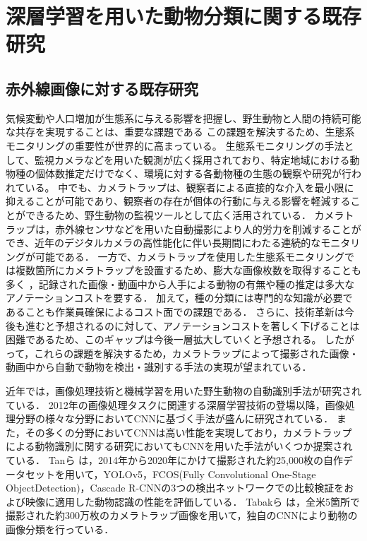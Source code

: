 \documentclass[a4paper,11pt,nomag]{jsreport}
\begin{document}
\setcounter{chapter}{2}

\chapter*{深層学習を用いた動物分類に関する既存研究}

\section{赤外線画像に対する既存研究}

気候変動や人口増加が生態系に与える影響を把握し、野生動物と人間の持続可能な共存を実現することは、重要な課題である
この課題を解決するため、生態系モニタリングの重要性が世界的に高まっている\cite{zwerts2021, bandaru2024}。
生態系モニタリングの手法として、監視カメラなどを用いた観測が広く採用されており、特定地域における動物種の個体数推定だけでなく、環境に対する各動物種の生態の観察や研究が行われている\cite{trolliet2014}。
中でも、カメラトラップは、観察者による直接的な介入を最小限に抑えることが可能であり、観察者の存在が個体の行動に与える影響を軽減することができるため、野生動物の監視ツールとして広く活用されている\cite{本郷2018, abood2023}．
カメラトラップは，赤外線センサなどを用いた自動撮影により人的労力を削減することができ、近年のデジタルカメラの高性能化に伴い長期間にわたる連続的なモニタリングが可能である．
一方で、カメラトラップを使用した生態系モニタリングでは複数箇所にカメラトラップを設置するため、膨大な画像枚数を取得することも多く \cite{kays2020, si2014}，記録された画像・動画中から人手による動物の有無や種の推定は多大なアノテーションコストを要する\cite{thangaraj2023}．
加えて，種の分類には専門的な知識が必要であることも作業員確保によるコスト面での課題である．
さらに、技術革新は今後も進むと予想されるのに対して、アノテーションコストを著しく下げることは困難であるため、このギャップは今後一層拡大していくと予想される\cite{安藤2019}。
したがって，これらの課題を解決するため，カメラトラップによって撮影された画像・動画中から自動で動物を検出・識別する手法の実現が望まれている．

近年では，画像処理技術と機械学習を用いた野生動物の自動識別手法が研究されている．
2012年の画像処理タスクに関連する深層学習技術の登場以降，画像処理分野の様々な分野においてCNNに基づく手法が盛んに研究されている．
また，その多くの分野においてCNNは高い性能を実現しており，カメラトラップによる動物識別に関する研究においてもCNNを用いた手法がいくつか提案されている．
Tanら \cite{tan2022}は，2014年から2020年にかけて撮影された約25,000枚の自作データセットを用いて，YOLOv5，FCOS(Fully Convolutional One-Stage ObjectDetection)，Cascade R-CNNの3つの検出ネットワークでの比較検証をおよび映像に適用した動物認識の性能を評価している．
Tabakら \cite{tabak2019}は，全米5箇所で撮影された約300万枚のカメラトラップ画像を用いて，独自のCNNにより動物の画像分類を行っている．
\end{document}
